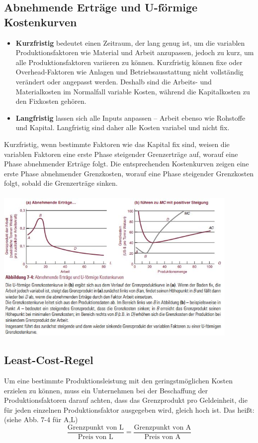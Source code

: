 \documentclass[10pt]{scrartcl}
\begin{document}
\subsection{Abnehmende Erträge und U-förmige Kostenkurven}
\begin{itemize}
\item
{\bf Kurzfristig } bedeutet einen Zeitraum, der lang genug ist, um die variablen Produktionsfaktoren wie Material und Arbeit anzupassen, jedoch zu kurz, um alle Produktionsfaktoren variieren zu können. Kurzfristig können fixe oder Overhead-Faktoren wie Anlagen und Betriebsausstattung nicht vollständig verändert oder angepasst werden. Deshalb sind die Arbeits- und Materialkosten im Normalfall variable Kosten, während die Kapitalkosten zu den Fixkosten gehören.
\item {\bf Langfristig} lassen sich alle Inputs anpassen – Arbeit ebenso wie Rohstoffe und Kapital. Langfristig sind daher alle Kosten variabel und nicht fix. 
\end{itemize}
Kurzfristig, wenn bestimmte Faktoren wie das Kapital fix sind, weisen die variablen Faktoren eine erste Phase steigender Grenzerträge auf, worauf eine Phase abnehmender Erträge folgt. Die entsprechenden Kostenkurven zeigen eine erste Phase abnehmender Grenzkosten, worauf eine Phase steigender Grenzkosten folgt, sobald die Grenzerträge sinken.\\ \\
\includegraphics[width=0.88\textwidth]{img/ertrage.jpg}
\subsection{Least-Cost-Regel}
Um eine bestimmte Produktionsleistung mit den geringstmöglichen Kosten erzielen zu können, muss ein Unternehmen bei der Beschaffung der Produktionsfaktoren darauf achten, dass das Grenzprodukt pro Geldeinheit, die für jeden einzelnen Produktionsfaktor ausgegeben wird, gleich hoch ist. Das heißt: (siehe Abb. 7-4 für A,L)\\
\begin{equation}
\frac{\text{Grenzpunkt von L}}{\text{Preis von L}} = \frac{\text{Grenzpunkt von A}}{\text{Preis von A}}  \nonumber
\end{equation}
\end{document}
